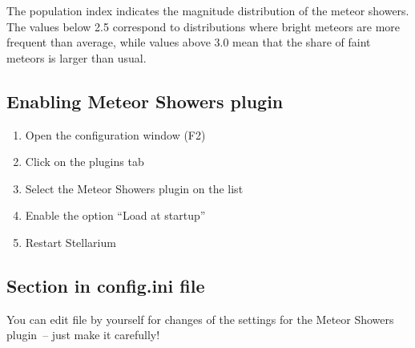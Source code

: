 The population index indicates the magnitude distribution of the meteor showers. The values below 2.5 correspond to distributions where bright meteors are more frequent than average, while values above 3.0 mean that the share of faint meteors is larger than usual.

\subsection{Enabling Meteor Showers plugin}
\label{sec:plugins:MeteorShowers:using}

\begin{enumerate}
\item Open the configuration window (F2)
\item Click on the plugins tab
\item Select the Meteor Showers plugin on the list
\item Enable the option ``Load at startup''
\item Restart Stellarium
\end{enumerate}

\subsection{Section  in config.ini file}
\label{sec:plugins:MeteorShowers:config}

You can edit  file by yourself for changes of the
settings for the Meteor Showers plugin~-- just make it carefully!

